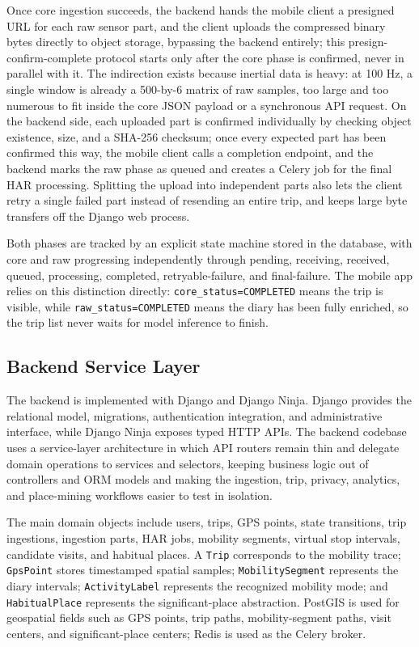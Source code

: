 \documentclass[conference,a4paper]{IEEEtran}
\begin{document}
Once core ingestion succeeds, the backend hands the mobile client a presigned URL for each raw sensor part, and the client uploads the compressed binary bytes directly to object storage, bypassing the backend entirely; this presign-confirm-complete protocol starts only after the core phase is confirmed, never in parallel with it. The indirection exists because inertial data is heavy: at 100 Hz, a single window is already a 500-by-6 matrix of raw samples, too large and too numerous to fit inside the core JSON payload or a synchronous API request. On the backend side, each uploaded part is confirmed individually by checking object existence, size, and a SHA-256 checksum; once every expected part has been confirmed this way, the mobile client calls a completion endpoint, and the backend marks the raw phase as queued and creates a Celery job for the final HAR processing. Splitting the upload into independent parts also lets the client retry a single failed part instead of resending an entire trip, and keeps large byte transfers off the Django web process.

Both phases are tracked by an explicit state machine stored in the database, with core and raw progressing independently through pending, receiving, received, queued, processing, completed, retryable-failure, and final-failure. The mobile app relies on this distinction directly: \texttt{core\_status=COMPLETED} means the trip is visible, while \texttt{raw\_status=COMPLETED} means the diary has been fully enriched, so the trip list never waits for model inference to finish.

\subsection{Backend Service Layer}

The backend is implemented with Django and Django Ninja. Django provides the relational model, migrations, authentication integration, and administrative interface, while Django Ninja exposes typed HTTP APIs. The backend codebase uses a service-layer architecture in which API routers remain thin and delegate domain operations to services and selectors, keeping business logic out of controllers and ORM models and making the ingestion, trip, privacy, analytics, and place-mining workflows easier to test in isolation.

The main domain objects include users, trips, GPS points, state transitions, trip ingestions, ingestion parts, HAR jobs, mobility segments, virtual stop intervals, candidate visits, and habitual places. A \texttt{Trip} corresponds to the mobility trace; \texttt{GpsPoint} stores timestamped spatial samples; \texttt{MobilitySegment} represents the diary intervals; \texttt{ActivityLabel} represents the recognized mobility mode; and \texttt{HabitualPlace} represents the significant-place abstraction. PostGIS is used for geospatial fields such as GPS points, trip paths, mobility-segment paths, visit centers, and significant-place centers; Redis is used as the Celery broker.
\end{document}

